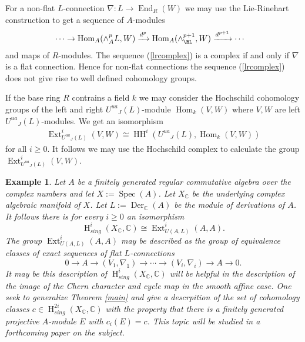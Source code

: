 \documentclass{amsart}
\theoremstyle{plain}
\newtheorem{example}[theorem]{Example}
\theoremstyle{definition}
\theoremstyle{remark}
\numberwithin{equation}{theorem}
\begin{document}
For a non-flat $L$-connection $\nabla:L\rightarrow {\operatorname{End} }_{R}(W)$ we may use the Lie-Rinehart construction to get a sequence
of ${A}$-modules
\begin{align}
&\label{lrcomplex} \cdots \rightarrow {\operatorname{Hom} }_{A}(\wedge^p_{A} L, W) \xrightarrow{d^p} {\operatorname{Hom} }_{A}(\wedge^{p+1}_\BL, W)
\xrightarrow{d^{p+1}}\cdots
\end{align}
and maps of ${R}$-modules. The sequence (\ref{lrcomplex}) is a complex if and only if $\nabla$ is a flat connection. Hence
for non-flat connections the sequence (\ref{lrcomplex}) does not give rise to well defined cohomology groups.

If the base ring ${R}$ contrains a field $k$ we may consider the Hochschild cohomology groups of the 
left and right ${U^{ua}}_J(L)$-module ${\operatorname{Hom} }_k(V,W)$ where $V,W$ are left ${U^{ua}}_J(L)$-modules. We get an isomorphism
\begin{align}
\label{hochschild} {\operatorname{Ext} }^i_{{U^{ua}}_J(L)}(V,W)\cong {\operatorname{HH}}^i({U^{ua}}_J(L), {\operatorname{Hom} }_k(V,W)) 
\end{align}
for all $i\geq 0$. It follows we may use the Hochschild complex to calculate the group ${\operatorname{Ext} }^i_{{U^{ua}}_J(L)}(V,W)$. 

\begin{example} 

Let ${A}$ be a finitely generated regular commutative algebra over the complex numbers and let $X:={\operatorname{Spec} }({A})$.
Let $X_{\mathbb{C} }$ be the underlying complex algebraic manifold of $X$. Let $L:={\operatorname{Der} }_{\mathbb{C} }({A})$ be the module 
of derivations of ${A}$. It follows there is for every $i\geq 0$ an isomorphism
\[ {\operatorname{H} }^i_{sing}(X_{\mathbb{C} }, {\mathbb{C} })\cong {\operatorname{Ext} }^i_{U({A},L)}({A},{A}).\]
The group ${\operatorname{Ext} }^i_{U({A},L)}({A},{A})$ may be described as the group of equivalence classes of exact sequences
of flat $L$-connections
\[ 0\rightarrow {A} \rightarrow (V_1,\nabla_1)\rightarrow \cdots \rightarrow (V_i,\nabla_i)\rightarrow {A} \rightarrow 0.\]
It may be this description of ${\operatorname{H} }^i_{sing}(X_{\mathbb{C} }, {\mathbb{C} })$ will be helpful in the description 
of the image of the Chern character and cycle map in the smooth affine case. One seek to generalize Theorem \ref{main}
and give a descrpition of the set of cohomology classes $c\in {\operatorname{H} }^{2i}_{sing}(X_{\mathbb{C} }, {\mathbb{C} })$ with the property 
that there is a finitely generated projective ${A}$-module $E$ with $c_i(E)=c$.
This topic will be studied in a forthcoming paper on the subject.
\end{example}
\end{document}
